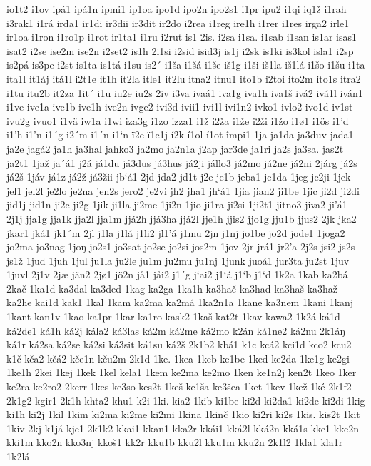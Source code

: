 io1t2
i1ov
ipá1
ipá1n
ipmi1
ip1oa
ipo1d
ipo2n
ipo2s1
i1pr
ipu2
i1qi
iq1ž
i1rah
i3rak1
i1rá
irda1
ir1di
ir3dii
ir3dit
ir2do
i2rea
i1reg
ire1h
i1rer
i1res
irga2
irle1
ir1oa
i1ron
i1ro1p
i1rot
ir1ta1
i1ru
i2rut
is1
2is.
i2sa
i1sa.
i1sab
i1san
is1ar
isas1
isat2
i2se
ise2m
ise2n
i2set2
is1h
2i1si
i2sid
isid3j
is1j
i2sk
is1ki
is3kol
isla1
i2sp
is2pá
is3pe
i2st
is1ta
is1tá
i1su
is2´
i1ša
i1šá
i1še
iš1g
i1ši
iš1la
iš1lá
i1šo
i1šu
i1ta
ita1l
it1áj
itá1l
i2t1e
it1h
it2la
itle1
it2lu
itna2
itnu1
ito1b
i2toi
ito2m
ito1s
itra2
i1tu
itu2b
it2za
1it´
i1u
iu2e
iu2s
2iv
i3va
ivaá1
iva1g
iva1h
iva1š
ivá2
ivá1l
iván1
i1ve
ive1a
ive1b
ive1h
ive2n
ivge2
ivi3d
ivii1
ivi1l
ivi1n2
ivko1
ivlo2
ivo1d
iv1st
ivu2g
ivuo1
i1vä
iw1a
i1wi
iza3g
i1zo
izza1
i1ž
i2ža
i1že
i2ži
i1žo
i1ø1
i1ös
i1'd
i1'h
i1'n
i1´g
i2´m
i1´n
i1`n
ï2e
ï1e1j
í2k
í1ol
í1ot
împi1
1ja
ja1da
ja3duv
jađa1
ja2e
jagá2
ja1h
ja3hal
jahko3
ja2mo
ja2n1a
j2ap
jar3de
ja1ri
ja2s
ja3sa.
jas2t
ja2t1
1jaž
ja´á1
j2á
já1du
já3dus
já3hus
já2ji
jállo3
já2mo
já2ne
já2ni
2járg
já2s
já2š
1jáv
já1z
já2ž
já3žii
jb`á1
2jd
jda2
jd1t
j2e
je1b
jeba1
je1da
1jeg
je2ji
1jek
jel1
jel2l
je2lo
je2na
jen2s
jero2
je2vi
jh2
jha1
jh`á1
1jia
jian2
ji1be
1jic
ji2d
ji2di
jid1j
jid1n
ji2e
ji2g
1jik
ji1la
ji2me
1ji2n
1jio
ji1ra
ji2si
1ji2t1
jitno3
jiva2
ji'á1
2j1j
jja1g
jja1k
jja2l
jja1m
jjá2h
jjá3ha
jjá2l
jje1h
jjis2
jjo1g
jju1b
jjus2
2jk
jka2
jkar1
jká1
jk1´m
2jl
j1la
j1lá
j1li2
jl1'á
j1mu
2jn
j1nj
jo1be
jo2d
jode1
1joga2
jo2ma
jo3nag
1joŋ
jo2s1
jo3sat
jo2se
jo2si
jos2m
1jov
2jr
jrá1
jr2'a
2j2s
jsi2
js2s
js1ž
1jud
1juh
1jul
ju1la
ju2le
ju1m
ju2mu
ju1nj
1junk
juoá1
jur3ta
ju2st
1juv
1juvl
2j1v
2jæ
jän2
2jø1
jö2n
jå1
jåi2
j1´g
j`ai2
j1`á
j1`b
j1`d
1k2a
1kab
ka2bá
2kač
1ka1d
ka3dal
ka3ded
1kag
ka2ga
1ka1h
ka3hač
ka3had
ka3haš
ka3haž
ka2he
kai1d
kak1
1kal
1kam
ka2ma
ka2má
1ka2n1a
1kane
ka3nem
1kani
1kanj
1kant
kan1v
1kao
ka1pr
1kar
ka1ro
kask2
1kaš
kat2t
1kav
kawa2
1k2á
ká1d
ká2de1
ká1h
ká2j
kála2
ká3las
ká2m
ká2me
ká2mo
k2án
ká1ne2
ká2nu
2k1áŋ
ká1r
ká2sa
ká2se
ká2si
ká3sit
ká1su
ká2š
2k1b2
kbá1
k1c
kcá2
kci1d
kco2
kcu2
k1č
kča2
kčá2
kče1n
kču2m
2k1d
1ke.
1kea
1keb
ke1be
1ked
ke2da
1ke1g
ke2gi
1ke1h
2kei
1kej
1kek
1kel
kela1
1kem
ke2ma
ke2mo
1ken
ke1n2j
ken2t
1keo
1ker
ke2ra
ke2ro2
2kerr
1kes
ke3so
kes2t
1keš
ke1ša
ke3šea
1ket
1kev
1kež
1ké
2k1f2
2k1g2
kgir1
2k1h
khta2
khu1
k2i
1ki.
kia2
1kib
ki1be
ki2d
ki2da1
ki2de
ki2di
1kig
ki1h
ki2j
1kil
1kim
ki2ma
ki2me
ki2mi
1kina
1kinč
1kio
ki2ri
ki2s
1kis.
kis2t
1kit
1kiv
2kj
k1já
kje1
2k1k2
kkai1
kkan1
kka2r
kkái1
kká2l
kká2n
kká1s
kke1
kke2n
kki1m
kko2n
kko3nj
kkoš1
kk2r
kku1b
kku2l
kku1m
kku2n
2k1l2
1kla1
kla1r
1k2lá

